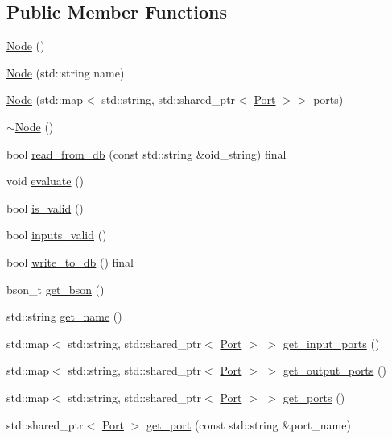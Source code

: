 \subsection*{Public Member Functions}
\begin{DoxyCompactItemize}
\item 
\hyperlink{class_node_ad7a34779cad45d997bfd6d3d8043c75f}{Node} ()
\item 
\hyperlink{class_node_afceb8877cfab44e0eda5ae3a88513242}{Node} (std\+::string name)
\item 
\hyperlink{class_node_acdcee054c893b696b5bc08a8eba1a668}{Node} (std\+::map$<$ std\+::string, std\+::shared\+\_\+ptr$<$ \hyperlink{class_port}{Port} $>$$>$ ports)
\item 
\hyperlink{class_node_aa0840c3cb5c7159be6d992adecd2097c}{$\sim$\+Node} ()
\item 
bool \hyperlink{class_node_a60c605aced4420d3d6f6fe54b5a5b6bb}{read\+\_\+from\+\_\+db} (const std\+::string \&oid\+\_\+string) final
\item 
void \hyperlink{class_node_a0a3c8430a9e5b6b725c87bbcf7adc54b}{evaluate} ()
\item 
bool \hyperlink{class_node_a8d821a6df3cd9504fefc551d5bd0a64f}{is\+\_\+valid} ()
\item 
bool \hyperlink{class_node_adb04f5aa8b454b19db663b3f240e9061}{inputs\+\_\+valid} ()
\item 
bool \hyperlink{class_node_ad5cacb320e423275faef1bfc8c7a365b}{write\+\_\+to\+\_\+db} () final
\item 
bson\+\_\+t \hyperlink{class_node_a9568e1bba3436d78e77862902e328592}{get\+\_\+bson} ()
\item 
std\+::string \hyperlink{class_node_a0cc0386322fca056e49e49d869ade853}{get\+\_\+name} ()
\item 
std\+::map$<$ std\+::string, std\+::shared\+\_\+ptr$<$ \hyperlink{class_port}{Port} $>$ $>$ \hyperlink{class_node_aab2f990047525bd3bfe7be041a8a201c}{get\+\_\+input\+\_\+ports} ()
\item 
std\+::map$<$ std\+::string, std\+::shared\+\_\+ptr$<$ \hyperlink{class_port}{Port} $>$ $>$ \hyperlink{class_node_a060160b85a15190fcf98fa0a3f9ec4e6}{get\+\_\+output\+\_\+ports} ()
\item 
std\+::map$<$ std\+::string, std\+::shared\+\_\+ptr$<$ \hyperlink{class_port}{Port} $>$ $>$ \hyperlink{class_node_a90fc0096ba3a5094f0696dde1dd5b08d}{get\+\_\+ports} ()
\item 
std\+::shared\+\_\+ptr$<$ \hyperlink{class_port}{Port} $>$ \hyperlink{class_node_a71b857799058e56ccb9593a69fc675bc}{get\+\_\+port} (const std\+::string \&port\+\_\+name)
$$
\end{DoxyCompactItemize}
